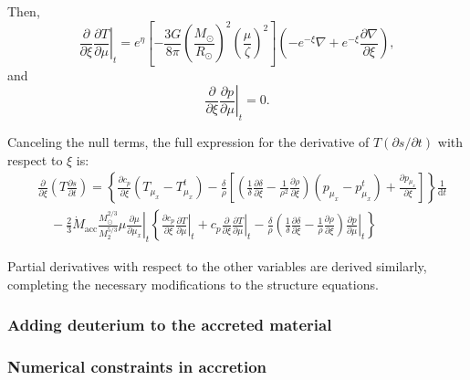 \documentclass[12pt,a4paper]{article}
\newcommand{\mr}{\mathrm}
\newcommand{\pfird}[2][]{\frac{\partial#1}{\partial#2}}
\newcommand{\dd}[1]{\mathrm{d}#1}
\begin{document}
Then, 
\begin{equation}
  \pfird[]{\xi}\left.\pfird[T]{\mu}\right|_t = e^\eta\left[-\frac{3G}{8\pi}\left(\frac{M_\odot}{R_\odot}\right)^2\left(\frac{\mu}{\zeta}\right)^2\right]\left(-e^{-\xi}\nabla + e^{-\xi}\pfird[\nabla]{\xi}\right),
\end{equation}
and 
\begin{equation}
  \pfird[]{\xi}\left.\pfird[p]{\mu}\right|_t = 0.
\end{equation}

Canceling the null terms, the full expression for the derivative of $T(\partial s/\partial t)$ with respect to $\xi$ is:
\begin{align}
  &\pfird[]{\xi}\left(T\pfird[s]{t}\right) = \left\{\pfird[c_p]{\xi}\left(T_{\mu_x} - T_{\mu_x}^t\right) - \frac{\delta}{\rho}\left[\left(\frac{1}{\delta}\pfird[\delta]{\xi} - \frac{1}{\rho^2}\pfird[\rho]{\xi}\right)\left(p_{\mu_x} - p_{\mu_x}^t\right)  +\pfird[p_{\mu_x}]{\xi}\right]\right\}\frac{1}{\dd{t}}\\
  &\quad-\frac{2}{3}\dot{M}_\mr{acc}\frac{M_\odot^{2/3}}{M_2^{5/3}}\mu\left.\pfird[\mu]{\mu_x}\right|_t\left\{\pfird[c_p]{\xi}\left.\pfird[T]{\mu}\right|_t + c_p\pfird[]{\xi}\left.\pfird[T]{\mu}\right|_t - \frac{\delta}{\rho}\left(\frac{1}{\delta}\pfird[\delta]{\xi} - \frac{1}{\rho}\pfird[\rho]{\xi}\right)\left.\pfird[p]{\mu}\right|_t\right\}
\end{align}

Partial derivatives with respect to the other variables are derived similarly, completing the necessary modifications to the structure equations. 

\subsubsection{Adding deuterium to the accreted material}
\label{sec:accretion_deuterium}


\subsubsection{Numerical constraints in accretion}
\label{sec:numerical_constraints}

\end{document}
